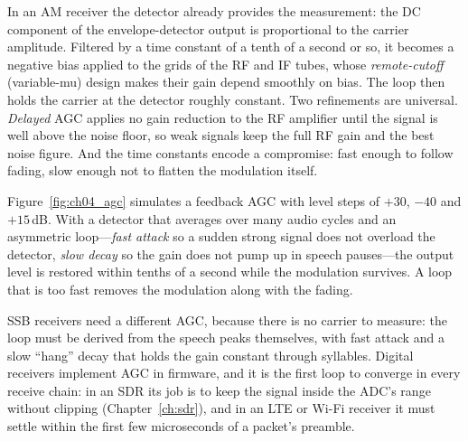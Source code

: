 
In an AM receiver the detector already provides the measurement: the DC component of the envelope-detector
output is proportional to the carrier amplitude. Filtered by a time constant of a tenth of a second or so, it
becomes a negative bias applied to the grids of the RF and IF tubes, whose \emph{remote-cutoff} (variable-mu)
design makes their gain depend smoothly on bias. The loop then holds the carrier at the detector roughly
constant. Two refinements are universal. \emph{Delayed} AGC applies no gain reduction to the RF amplifier
until the signal is well above the noise floor, so weak signals keep the full RF gain and the best noise
figure. And the time constants encode a compromise: fast enough to follow fading, slow enough not to flatten
the modulation itself.

Figure~\ref{fig:ch04_agc} simulates a feedback AGC with level steps of $+30$, $-40$ and $+15$\,dB. With a
detector that averages over many audio cycles and an asymmetric loop---\emph{fast attack} so a sudden strong
signal does not overload the detector, \emph{slow decay} so the gain does not pump up in speech pauses---the
output level is restored within tenths of a second while the modulation survives. A loop that is too fast
removes the modulation along with the fading.


SSB receivers need a different AGC, because there is no carrier to measure: the loop must be derived from the
speech peaks themselves, with fast attack and a slow ``hang'' decay that holds the gain constant through
syllables. Digital receivers implement AGC in firmware, and it is the first loop to converge in every receive
chain: in an SDR its job is to keep the signal inside the ADC's range without clipping (Chapter~\ref{ch:sdr}),
and in an LTE or Wi-Fi receiver it must settle within the first few microseconds of a packet's preamble.

